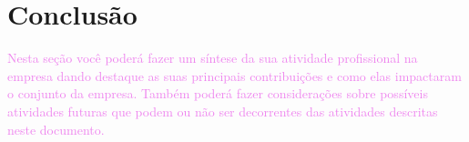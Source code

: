 \section{Conclusão}
\label{sec:conclusao}

\textcolor{violet}{Nesta seção você poderá fazer um síntese da sua atividade profissional na empresa dando destaque as suas principais contribuições e como elas impactaram o conjunto da empresa. Também poderá fazer considerações sobre possíveis atividades futuras que podem ou não ser decorrentes das atividades descritas neste documento.}
